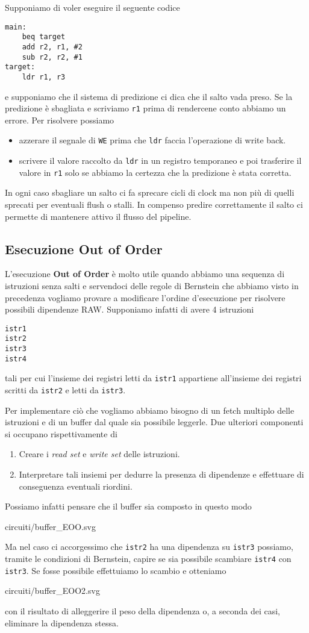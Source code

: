 Supponiamo di voler eseguire il seguente codice
\begin{verbatim}
main:
	beq target
	add r2, r1, #2
	sub r2, r2, #1
target:
	ldr r1, r3
\end{verbatim}
e supponiamo che il sistema di predizione ci dica che il salto vada preso. Se la predizione è
sbagliata e scriviamo \verb|r1| prima di rendercene conto abbiamo un errore. Per risolvere possiamo
\begin{itemize}
	\item azzerare il segnale di \verb|WE| prima che \verb|ldr| faccia l'operazione di write back.
	\item scrivere il valore raccolto da \verb|ldr| in un registro temporaneo e poi trasferire il
	      valore in \verb|r1| solo se abbiamo la certezza che la predizione è stata corretta.
\end{itemize}
In ogni caso sbagliare un salto ci fa sprecare cicli di clock ma non più di quelli sprecati per
eventuali flush o stalli. In compenso predire correttamente il salto ci permette di mantenere
attivo il flusso del pipeline.

\subsection{Esecuzione Out of Order}
L'esecuzione \textbf{Out of Order} è molto utile quando abbiamo una sequenza di istruzioni senza
salti e servendoci delle regole di Bernstein che abbiamo visto in precedenza vogliamo provare a
modificare l'ordine d'esecuzione per risolvere possibili dipendenze RAW. Supponiamo infatti di
avere 4 istruzioni
\begin{verbatim}
istr1
istr2
istr3
istr4
\end{verbatim}
tali per cui l'insieme dei registri letti da \verb|istr1| appartiene all'insieme dei registri
scritti da \verb|istr2| e letti da \verb|istr3|.

Per implementare ciò che vogliamo abbiamo bisogno di un fetch multiplo delle istruzioni e di un
buffer dal quale sia possibile leggerle. Due ulteriori componenti si occupano rispettivamente di
\begin{enumerate}
	\item Creare i \emph{read set} e \emph{write set} delle istruzioni.
	\item Interpretare tali insiemi per dedurre la presenza di dipendenze e effettuare di
	      conseguenza eventuali riordini.
\end{enumerate}
Possiamo infatti pensare che il buffer sia composto in questo modo
\begin{center}
	 {circuiti/buffer_EOO.svg}
\end{center}
Ma nel caso ci accorgessimo che \verb|istr2| ha una dipendenza su \verb|istr3| possiamo, tramite
le condizioni di Bernstein, capire se sia possibile scambiare \verb|istr4| con \verb|istr3|. Se
fosse possibile effettuiamo lo scambio e otteniamo
\begin{center}
	 {circuiti/buffer_EOO2.svg}
\end{center}
con il risultato di alleggerire il peso della dipendenza o, a seconda dei casi, eliminare la
dipendenza stessa.
